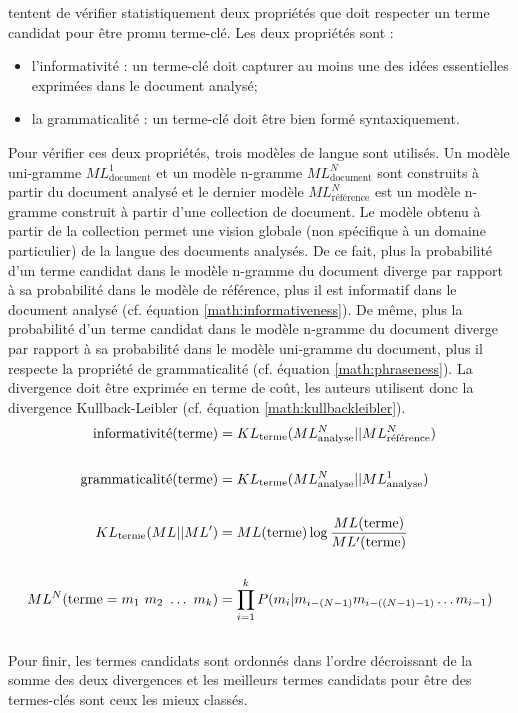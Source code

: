           \citet{tomokiyo2003languagemodel} tentent de vérifier statistiquement deux
          propriétés que doit respecter un terme candidat pour être promu terme-clé.
          Les deux propriétés sont :
          \begin{itemize}
            \item{l'informativité : un terme-clé doit capturer au moins une des
                  idées essentielles exprimées dans le document analysé;}
            \item{la grammaticalité : un terme-clé doit être bien formé
                  syntaxiquement.}
          \end{itemize}
          Pour vérifier ces deux propriétés, trois modèles de langue sont utilisés.
          Un modèle uni-gramme $ML_{\text{document}}^1$ et un modèle n-gramme
          $ML_{\text{document}}^N$ sont construits à partir du document analysé et
          le dernier modèle $ML_{\text{référence}}^N$ est un modèle n-gramme
          construit à partir d'une collection de document. Le modèle obtenu à partir
          de la collection permet une vision globale (non spécifique à un
          domaine particulier) de la langue des documents analysés. De ce fait, plus
          la probabilité d'un terme candidat dans le modèle n-gramme du document
          diverge par rapport à sa probabilité dans le modèle de référence, plus il
          est informatif dans le document analysé (cf. équation
          \ref{math:informativeness}).  De même, plus la probabilité d'un terme
          candidat dans le modèle n-gramme du document diverge par rapport à sa
          probabilité dans le modèle uni-gramme du document, plus il respecte la
          propriété de grammaticalité (cf. équation \ref{math:phraseness}). La
          divergence doit être exprimée en terme de coût, les auteurs utilisent donc
          la divergence Kullback-Leibler (cf. équation \ref{math:kullbackleibler}).
          \begin{align}
            \text{informativité}(\text{terme}) &= KL_{\text{terme}}(ML_{\text{analyse}}^{N} || ML_{\text{référence}}^{N}) \label{math:informativeness}\\
            \notag\\
            \text{grammaticalité}(\text{terme}) &= KL_{\text{terme}}(ML_{\text{analyse}}^{N} || ML_{\text{analyse}}^{1}) \label{math:phraseness}\\
            \notag\\
            KL_{\text{terme}}(ML || ML') &= ML(\text{terme}) \log \frac{ML(\text{terme})}{ML'(\text{terme})} \label{math:kullbackleibler}\\
            \notag\\
            ML^N(\text{terme} = m_1\ m_2\ \dots\ m_k) &= \prod_{i = 1}^k P(m_i | m_{i - (N - 1)} m_{i - ((N - 1) - 1)} \dots m_{i - 1}) \notag
          \end{align}\\
          Pour finir, les termes candidats sont ordonnés dans l'ordre décroissant de
          la somme des deux divergences et les meilleurs termes candidats pour être
          des termes-clés sont ceux les mieux classés.

